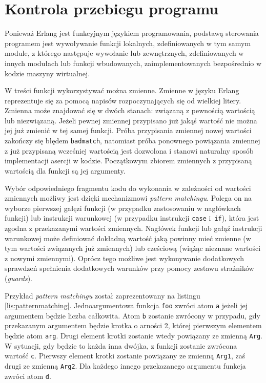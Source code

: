 \section{Kontrola przebiegu programu}
\label{sec:erlangFlow}

Ponieważ Erlang jest funkcyjnym językiem programowania, podstawą sterowania programem jest wywoływanie funkcji lokalnych, zdefiniowanych w tym samym module, z którego następuje wywołanie lub zewnętrznych, zdefiniowanych w innych modułach lub funkcji wbudowanych, zaimplementowanych bezpośrednio w kodzie maszyny wirtualnej.

W treści funkcji wykorzystywać można zmienne.
Zmienne w języku Erlang reprezentuje się za pomocą napisów rozpoczynających się od wielkiej litery.
Zmienna może znajdować się w dwóch stanach: związaną z pewnością wartością lub niezwiązaną.
Jeżeli pewnej zmiennej przypisano już jakąś wartość nie można jej już zmienić w tej samej funkcji.
Próba przypisania zmiennej nowej wartości zakończy się błędem \texttt{badmatch}, natomiast próba ponownego powiązania zmiennej z już przypisaną wcześniej wartością jest dozwolona i stanowi naturalny sposób implementacji asercji w kodzie.
Początkowym zbiorem zmiennych z przypisaną wartością dla funkcji są jej argumenty.

Wybór odpowiedniego fragmentu kodu do wykonania w zależności od wartości zmiennych możliwy jest dzięki mechanizmowi \emph{pattern matchingu}.
Polega on na wyborze pierwszej gałęzi funkcji (w przypadku zastosowaniu w nagłówkach funkcji) lub instrukcji warunkowej (w przypadku instrukcji \texttt{case} i~\texttt{if}), która jest zgodna z przekazanymi wartości zmiennych.
Nagłówek funkcji lub gałąź instrukcji warunkowej może definiować dokładną wartość jaką powinny mieć zmienne (w tym wartości związanych już zmiennych) lub cześciową (wiążąc nieznane wartości z nowymi zmiennymi).
Oprócz tego możliwe jest wykonywanie dodatkowych sprawdzeń spełnienia dodatkowych warunków przy pomocy zestawu strażników (\emph{guards}).

Przykład \emph{pattern matchingu} został zaprezentowany na listingu \ref{lis:patternmatching}.
Jednoargumentowa funkcja \texttt{foo} zwróci atom \texttt{a} jeżeli jej argumentem będzie liczba całkowita.
Atom \texttt{b} zostanie zwrócony w przypadu, gdy przekazanym argumentem będzie krotka o arności 2, której pierwszym elementem będzie atom \texttt{arg}. Drugi element krotki zostanie wtedy powiązany ze zmienną \texttt{Arg}. W sytuacji, gdy będzie to każda inna dwójka, z funkcji zostanie zwrócona wartość \texttt{c}. Pierwszy element krotki zostanie powiązany ze zmienną \texttt{Arg1}, zaś drugi ze zmienną \texttt{Arg2}.
Dla każdego innego przekazanego argumentu funkcja zwróci atom \texttt{d}.

